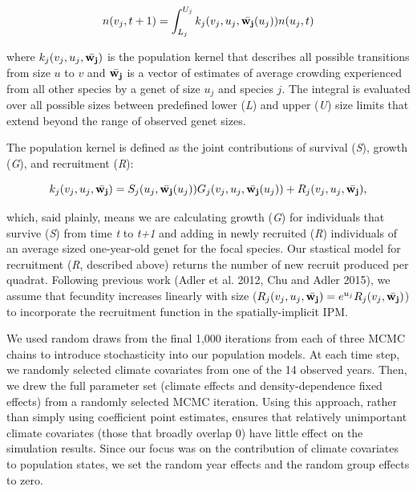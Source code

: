 \documentclass[12pt,]{article}
\begin{document}
\begin{equation}
n(v_{j},t+1) = \int_{L_{j}}^{U_{j}} k_{j}(v_{j},u_{j},\bar{\bold{w_{j}}}(u_{j}))n(u_{j},t)
\end{equation}

where $k_{j}(v_{j},u_{j},\bar{\bold{w_{j}}})$ is the population kernel
that describes all possible transitions from size $u$ to $v$ and
$\bar{\bold{w_{j}}}$ is a vector of estimates of average crowding
experienced from all other species by a genet of size $u_j$ and species
$j$. The integral is evaluated over all possible sizes between
predefined lower (\emph{L}) and upper (\emph{U}) size limits that extend
beyond the range of observed genet sizes.

The population kernel is defined as the joint contributions of survival
(\emph{S}), growth (\emph{G}), and recruitment (\emph{R}):

\begin{equation}
k_{j}(v_{j},u_{j},\bar{\bold{w_{j}}}) = S_j(u_j, \bar{\bold{w_{j}}}(u_{j}))G_j(v_{j},u_{j},\bar{\bold{w_{j}}}(u_{j})) + R_j(v_{j},u_{j},\bar{\bold{w_{j}}}),
\end{equation}

which, said plainly, means we are calculating growth (\emph{G}) for
individuals that survive (\emph{S}) from time \emph{t} to \emph{t+1} and
adding in newly recruited (\emph{R}) individuals of an average sized
one-year-old genet for the focal species. Our stastical model for
recruitment (\emph{R}, described above) returns the number of new
recruit produced per quadrat. Following previous work (Adler et al.
2012, Chu and Adler 2015), we assume that fecundity increases linearly
with size
($R_j(v_{j},u_{j},\bar{\bold{w_{j}}}) = e^{u_j}R_j(v_{j},\bar{\bold{w_{j}}})$)
to incorporate the recruitment function in the spatially-implicit IPM.

We used random draws from the final 1,000 iterations from each of three
MCMC chains to introduce stochasticity into our population models. At
each time step, we randomly selected climate covariates from one of the
14 observed years. Then, we drew the full parameter set (climate effects
and density-dependence fixed effects) from a randomly selected MCMC
iteration. Using this approach, rather than simply using coefficient
point estimates, ensures that relatively unimportant climate covariates
(those that broadly overlap 0) have little effect on the simulation
results. Since our focus was on the contribution of climate covariates
to population states, we set the random year effects and the random
group effects to zero.
\end{document}
